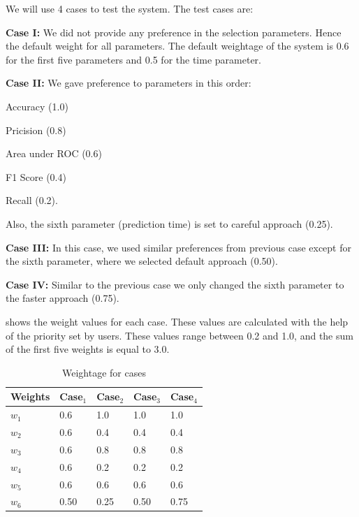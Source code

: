 \documentclass[a4paper,fleqn]{cas-dc}
\begin{document}
We will use 4 cases to test the system. The test cases are:

\noindent
{\bfseries Case I:} We did not provide any preference in the selection parameters. Hence the default weight for all parameters. The default weightage of the system is 0.6 for the first five parameters and 0.5 for the time parameter.

\vspace*{0.5em}
\noindent
{\bfseries Case II:} We gave preference to parameters in this order:
\begin{enumerate*}[label=\arabic{*}.]
    \item Accuracy (1.0)
    \item Pricision (0.8)
    \item Area under ROC (0.6)
    \item F1 Score (0.4)
    \item Recall (0.2).
\end{enumerate*}

\noindent
Also, the sixth parameter (prediction time) is set to careful approach (0.25).

\vspace*{0.5em}
\noindent
{\bfseries Case III:} In this case, we used similar preferences from previous case except for the sixth parameter, where we selected default approach (0.50).

\vspace*{0.5em}
\noindent
{\bfseries Case IV:} Similar to the previous case we only changed the sixth parameter to the faster approach (0.75).

\vspace*{0.5em}
 shows the weight values for each case. These values are calculated with the help of the priority set by users. These values range between 0.2 and 1.0, and the sum of the first five weights is equal to 3.0.

\begin{table}[h]
    \caption{Weightage for cases}\label{tab:wieghtage_for_cases}
    \begin{tabular*}{\tblwidth}{@{}LLLLL@{}}
        \toprule
        Weights & Case$_1$ & Case$_2$ & Case$_3$ & Case$_4$ \\
        \midrule
        $w_1$ & 0.6 & 1.0 & 1.0 & 1.0 \\
        $w_2$ & 0.6 & 0.4 & 0.4 & 0.4 \\
        $w_3$ & 0.6 & 0.8 & 0.8 & 0.8 \\
        $w_4$ & 0.6 & 0.2 & 0.2 & 0.2 \\
        $w_5$ & 0.6 & 0.6 & 0.6 & 0.6 \\
        $w_6$ & 0.50 & 0.25 & 0.50 & 0.75 \\
        \bottomrule
    \end{tabular*}
\end{table}
\end{document}
